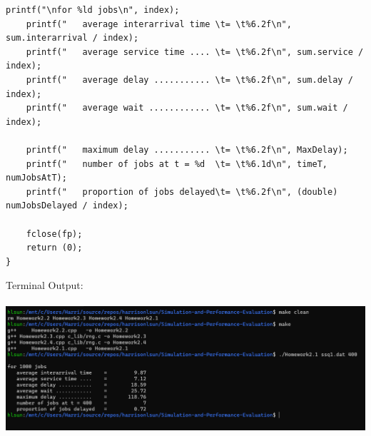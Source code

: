 \begin{lstlisting}[style=CStyle]
    printf("\nfor %ld jobs\n", index);
    printf("   average interarrival time \t= \t%6.2f\n", sum.interarrival / index);
    printf("   average service time .... \t= \t%6.2f\n", sum.service / index);
    printf("   average delay ........... \t= \t%6.2f\n", sum.delay / index);
    printf("   average wait ............ \t= \t%6.2f\n", sum.wait / index);

    printf("   maximum delay ........... \t= \t%6.2f\n", MaxDelay);
    printf("   number of jobs at t = %d  \t= \t%6.1d\n", timeT, numJobsAtT);
    printf("   proportion of jobs delayed\t= \t%6.2f\n", (double) numJobsDelayed / index);

    fclose(fp);
    return (0);
}

\end{lstlisting}
\vspace{20pt}
\noindent Terminal Output:\\\\

\includegraphics[scale = 0.5]{Sections/H2_1.png}
\newpage

